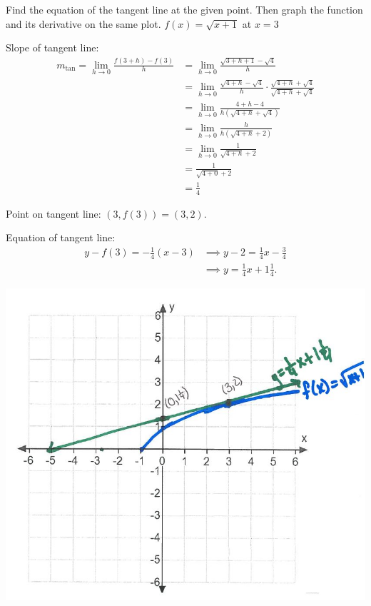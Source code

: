 \documentclass[nooutcomes]{ximera}
\begin{document}
\begin{problem} Find the equation of the tangent line at the given point.  Then graph the function and its derivative on the same plot.
$f(x)=\sqrt{x+1}$ at $x=3$

	\begin{freeResponse}
	Slope of tangent line:
	\begin{align*}	
	m_{\mathrm{tan}} = \lim_{h \to 0} \frac{f(3+h) - f(3)}{h}&=\lim_{h \to 0}\frac{\sqrt{3+h+1} - \sqrt{4}}{h}\\
	&=\lim_{h \to 0}\frac{\sqrt{4+h} - \sqrt{4}}{h} \cdot \frac{\sqrt{4+h} + \sqrt{4}}{\sqrt{4+h} + \sqrt{4}}\\
	&=\lim_{h \to 0}\frac{4+h-4}{h(\sqrt{4+h} + \sqrt{4})}\\
	&=\lim_{h \to 0}\frac{h}{h(\sqrt{4+h} + 2)}\\
	&=\lim_{h \to 0}\frac{1}{\sqrt{4+h} + 2}\\
	&=\frac{1}{\sqrt{4+0} + 2}\\
	&=\frac{1}{4}
	\end{align*}

        Point on tangent line: $(3, f(3)) = (3, 2)$.

        Equation of tangent line:
        \begin{align*}
          y - f(3) = - \frac{1}{4}(x-3) &\implies y - 2 = \frac{1}{4}x - \frac{3}{4}\\
          &\implies y = \frac{1}{4}x + 1\frac{1}{4}.
        \end{align*}
	        \begin{image}
          \includegraphics[scale = 0.6]{Figure5.JPG}
        \end{image}

	\end{freeResponse}

\end{problem}
\end{document}
